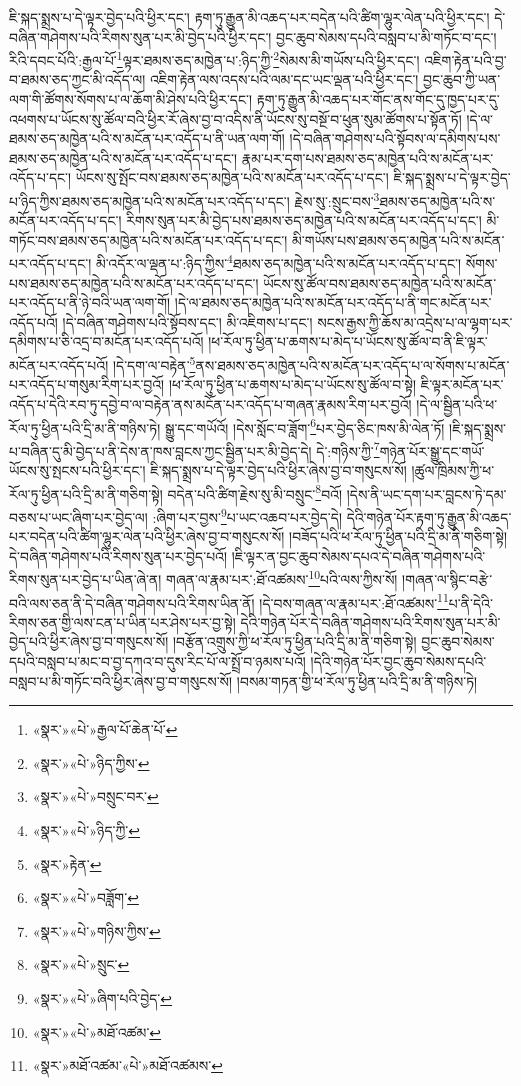 ཇི་སྐད་སྨྲས་པ་དེ་ལྟར་བྱེད་པའི་ཕྱིར་དང་། རྟག་ཏུ་རྒྱུན་མི་འཆད་པར་བདེན་པའི་ཚིག་ལྷུར་ལེན་པའི་ཕྱིར་དང་། དེ་བཞིན་གཤེགས་པའི་རིགས་སུན་པར་མི་བྱེད་པའི་ཕྱིར་དང་། བྱང་ཆུབ་སེམས་དཔའི་བསླབ་པ་མི་གཏོང་བ་དང་། རིའི་དབང་པོའི་:རྒྱལ་པོ་\footnote{«སྣར་»«པེ་»རྒྱལ་པོ་ཆེན་པོ་}ལྟར་ཐམས་ཅད་མཁྱེན་པ་:ཉིད་ཀྱི་\footnote{«སྣར་»«པེ་»ཉིད་ཀྱིས་}སེམས་མི་གཡོས་པའི་ཕྱིར་དང་། འཇིག་རྟེན་པའི་བྱ་བ་ཐམས་ཅད་ཀྱང་མི་འདོད་ལ། འཇིག་རྟེན་ལས་འདས་པའི་ལམ་དང་ཡང་ལྡན་པའི་ཕྱིར་དང་། བྱང་ཆུབ་ཀྱི་ཡན་ལག་གི་ཚོགས་སོགས་པ་ལ་ཆོག་མི་ཤེས་པའི་ཕྱིར་དང་། རྟག་ཏུ་རྒྱུན་མི་འཆད་པར་གོང་ནས་གོང་དུ་ཁྱད་པར་དུ་འཕགས་པ་ཡོངས་སུ་ཚོལ་བའི་ཕྱིར་རོ་ཞེས་བྱ་བ་འདིས་ནི་ཡོངས་སུ་བསྔོ་བ་ཕུན་སུམ་ཚོགས་པ་སྟོན་ཏོ། །དེ་ལ་ཐམས་ཅད་མཁྱེན་པའི་ས་མངོན་པར་འདོད་པ་ནི་ཡན་ལག་གོ། །དེ་བཞིན་གཤེགས་པའི་སྟོབས་ལ་དམིགས་པས་ཐམས་ཅད་མཁྱེན་པའི་ས་མངོན་པར་འདོད་པ་དང་། རྣམ་པར་དག་པས་ཐམས་ཅད་མཁྱེན་པའི་ས་མངོན་པར་འདོད་པ་དང་། ཡོངས་སུ་སྤོང་བས་ཐམས་ཅད་མཁྱེན་པའི་ས་མངོན་པར་འདོད་པ་དང་། ཇི་སྐད་སྨྲས་པ་དེ་ལྟར་བྱེད་པ་ཉིད་ཀྱིས་ཐམས་ཅད་མཁྱེན་པའི་ས་མངོན་པར་འདོད་པ་དང་། རྗེས་སུ་:སྲུང་བས་\footnote{«སྣར་»«པེ་»བསྲུང་བར་}ཐམས་ཅད་མཁྱེན་པའི་ས་མངོན་པར་འདོད་པ་དང་། རིགས་སུན་པར་མི་བྱེད་པས་ཐམས་ཅད་མཁྱེན་པའི་ས་མངོན་པར་འདོད་པ་དང་། མི་གཏོང་བས་ཐམས་ཅད་མཁྱེན་པའི་ས་མངོན་པར་འདོད་པ་དང་། མི་གཡོས་པས་ཐམས་ཅད་མཁྱེན་པའི་ས་མངོན་པར་འདོད་པ་དང་། མི་འདོར་ལ་ལྡན་པ་:ཉིད་ཀྱིས་\footnote{«སྣར་»«པེ་»ཉིད་ཀྱི་}ཐམས་ཅད་མཁྱེན་པའི་ས་མངོན་པར་འདོད་པ་དང་། སོགས་པས་ཐམས་ཅད་མཁྱེན་པའི་ས་མངོན་པར་འདོད་པ་དང་། ཡོངས་སུ་ཚོལ་བས་ཐམས་ཅད་མཁྱེན་པའི་ས་མངོན་པར་འདོད་པ་ནི་ཉེ་བའི་ཡན་ལག་གོ། །དེ་ལ་ཐམས་ཅད་མཁྱེན་པའི་ས་མངོན་པར་འདོད་པ་ནི་གང་མངོན་པར་འདོད་པའོ། །དེ་བཞིན་གཤེགས་པའི་སྟོབས་དང་། མི་འཇིགས་པ་དང་། སངས་རྒྱས་ཀྱི་ཆོས་མ་འདྲེས་པ་ལ་ལྷག་པར་དམིགས་པ་ཅི་འདྲ་བ་མངོན་པར་འདོད་པའོ། །ཕ་རོལ་ཏུ་ཕྱིན་པ་ཆགས་པ་མེད་པ་ཡོངས་སུ་ཚོལ་བ་ནི་ཇི་ལྟར་མངོན་པར་འདོད་པའོ། །དེ་དག་ལ་བརྟེན་\footnote{«སྣར་»རྟེན་}ནས་ཐམས་ཅད་མཁྱེན་པའི་ས་མངོན་པར་འདོད་པ་ལ་སོགས་པ་མངོན་པར་འདོད་པ་གསུམ་རིག་པར་བྱའོ། །ཕ་རོལ་ཏུ་ཕྱིན་པ་ཆགས་པ་མེད་པ་ཡོངས་སུ་ཚོལ་བ་སྟེ། ཇི་ལྟར་མངོན་པར་འདོད་པ་དེའི་རབ་ཏུ་དབྱེ་བ་ལ་བརྟེན་ནས་མངོན་པར་འདོད་པ་གཞན་རྣམས་རིག་པར་བྱའོ། །དེ་ལ་སྦྱིན་པའི་ཕ་རོལ་ཏུ་ཕྱིན་པའི་དྲི་མ་ནི་གཉིས་ཏེ། སྒྱུ་དང་གཡོའོ། །དེས་སློང་བ་ཟློག་\footnote{«སྣར་»«པེ་»བཟློག་}པར་བྱེད་ཅིང་ཁས་མི་ལེན་ཏོ། །ཇི་སྐད་སྨྲས་པ་བཞིན་དུ་མི་བྱེད་པ་ནི་དེས་ན་ཁས་བླངས་ཀྱང་སྦྱིན་པར་མི་བྱེད་དེ། དེ་:གཉིས་ཀྱི་\footnote{«སྣར་»«པེ་»གཉིས་ཀྱིས་}གཉེན་པོར་སྒྱུ་དང་གཡོ་ཡོངས་སུ་སྤངས་པའི་ཕྱིར་དང་། ཇི་སྐད་སྨྲས་པ་དེ་ལྟར་བྱེད་པའི་ཕྱིར་ཞེས་བྱ་བ་གསུངས་སོ། །ཚུལ་ཁྲིམས་ཀྱི་ཕ་རོལ་ཏུ་ཕྱིན་པའི་དྲི་མ་ནི་གཅིག་སྟེ། བདེན་པའི་ཚིག་རྗེས་སུ་མི་བསྲུང་\footnote{«སྣར་»«པེ་»སྲུང་}བའོ། །དེས་ནི་ཡང་དག་པར་བླངས་ཏེ་དམ་བཅས་པ་ཡང་ཞིག་པར་བྱེད་ལ། :ཞིག་པར་བྱས་\footnote{«སྣར་»«པེ་»ཞིག་པའི་བྱེད་}པ་ཡང་འཆབ་པར་བྱེད་དེ། དེའི་གཉེན་པོར་རྟག་ཏུ་རྒྱུན་མི་འཆད་པར་བདེན་པའི་ཚིག་ལྷུར་ལེན་པའི་ཕྱིར་ཞེས་བྱ་བ་གསུངས་སོ། །བཟོད་པའི་ཕ་རོལ་ཏུ་ཕྱིན་པའི་དྲི་མ་ནི་གཅིག་སྟེ། དེ་བཞིན་གཤེགས་པའི་རིགས་སུན་པར་བྱེད་པའོ། །ཇི་ལྟར་ན་བྱང་ཆུབ་སེམས་དཔའ་དེ་བཞིན་གཤེགས་པའི་རིགས་སུན་པར་བྱེད་པ་ཡིན་ཞེ་ན། གཞན་ལ་རྣམ་པར་:ཐོ་འཚམས་\footnote{«སྣར་»«པེ་»མཐོ་འཚམ་}པའི་ལས་ཀྱིས་སོ། །གཞན་ལ་སྙིང་བརྩེ་བའི་ལས་ཅན་ནི་དེ་བཞིན་གཤེགས་པའི་རིགས་ཡིན་ནོ། །དེ་བས་གཞན་ལ་རྣམ་པར་:ཐོ་འཚམས་\footnote{«སྣར་»མཐོ་འཚམ་«པེ་»མཐོ་འཚམས་}པ་ནི་དེའི་རིགས་ཅན་གྱི་ལས་ངན་པ་ཡིན་པར་ཤེས་པར་བྱ་སྟེ། དེའི་གཉེན་པོར་དེ་བཞིན་གཤེགས་པའི་རིགས་སུན་པར་མི་བྱེད་པའི་ཕྱིར་ཞེས་བྱ་བ་གསུངས་སོ། །བརྩོན་འགྲུས་ཀྱི་ཕ་རོལ་ཏུ་ཕྱིན་པའི་དྲི་མ་ནི་གཅིག་སྟེ། བྱང་ཆུབ་སེམས་དཔའི་བསླབ་པ་མང་བ་བྱ་དཀའ་བ་དུས་རིང་པོ་ལ་སྤྲོ་བ་ཉམས་པའོ། །དེའི་གཉེན་པོར་བྱང་ཆུབ་སེམས་དཔའི་བསླབ་པ་མི་གཏོང་བའི་ཕྱིར་ཞེས་བྱ་བ་གསུངས་སོ། །བསམ་གཏན་གྱི་ཕ་རོལ་ཏུ་ཕྱིན་པའི་དྲི་མ་ནི་གཉིས་ཏེ། 